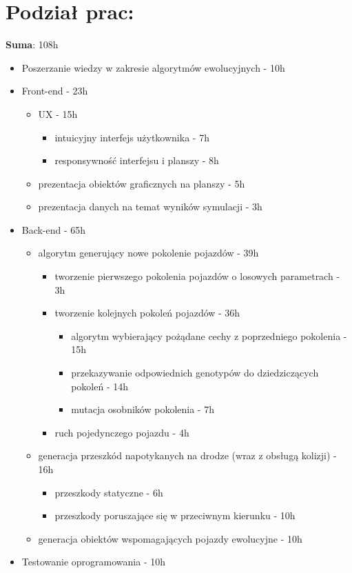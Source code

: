 \documentclass[10pt]{article}
\newcommand{\itemlist}[1]{\begin{itemize}#1\end{itemize}}
\begin{document}
\section*{Podział prac:}
\maketitle
{\bf Suma}: 108h
\itemlist{
\item Poszerzanie wiedzy w zakresie algorytmów ewolucyjnych - 10h
\item Front-end - 23h
\itemlist{
\item UX - 15h
\itemlist{
\item intuicyjny interfejs użytkownika - 7h
\item responsywność interfejsu i planszy - 8h
}
\item prezentacja obiektów graficznych na planszy - 5h
\item prezentacja danych na temat wyników symulacji - 3h
}
\item Back-end - 65h
\itemlist{
\item algorytm generujący nowe pokolenie pojazdów - 39h
\itemlist{
\item tworzenie pierwszego pokolenia pojazdów o losowych parametrach - 3h
\item tworzenie kolejnych pokoleń pojazdów - 36h
\itemlist{
\item algorytm wybierający pożądane cechy z poprzedniego pokolenia - 15h
\item przekazywanie odpowiednich genotypów do dziedziczących pokoleń - 14h
\item mutacja osobników pokolenia - 7h
}
\item ruch pojedynczego pojazdu - 4h
}
\item generacja przeszkód napotykanych na drodze (wraz z obsługą kolizji) - 16h
\itemlist{
\item przeszkody statyczne - 6h
\item przeszkody poruszające się w przeciwnym kierunku - 10h
}
\item generacja obiektów wspomagających pojazdy ewolucyjne - 10h
}
\item Testowanie oprogramowania - 10h
}
\end{document}
